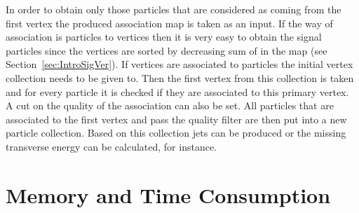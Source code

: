 In order to obtain only those particles that are considered as coming from the first vertex the produced association map is taken as an input. If the way of association is particles to vertices then it is very easy to obtain the signal particles since the vertices are sorted by decreasing sum of \pt in the map (see Section~\ref{sec:IntroSigVer}). If vertices are associated to particles the initial vertex collection needs to be given to. Then the first vertex from this collection is taken and for every particle it is checked if they are associated to this primary vertex. A cut on the quality of the association can also be set. All particles that are associated to the first vertex and pass the quality filter are then put into a new particle collection. Based on this collection jets can be produced or the missing transverse energy can be calculated, for instance.

\section{Memory and Time Consumption \label{sec:OSPMemTime}}

